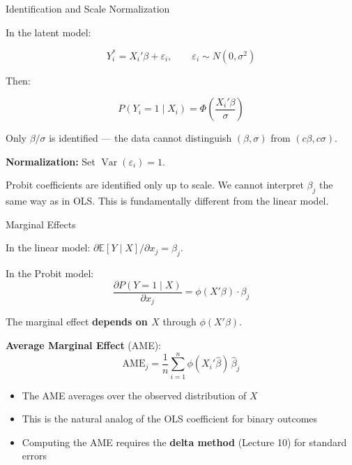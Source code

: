 \documentclass[aspectratio=169, handout, t]{beamer}
\numberwithin{equation}{section}
\begin{document}

\begin{frame}{Identification and Scale Normalization}

In the latent model:

\[
Y_i^* = X_i'\beta + \varepsilon_i, \qquad \varepsilon_i \sim N(0,\sigma^2)
\]

\pause

Then:

\[
P(Y_i=1 \mid X_i)
=
\Phi\left(\frac{X_i'\beta}{\sigma}\right)
\]

\pause

Only $\beta/\sigma$ is identified --- the data cannot distinguish $(\beta, \sigma)$ from $(c\beta, c\sigma)$.

\pause

\textbf{Normalization:} Set $\operatorname{Var}(\varepsilon_i) = 1$.

\pause

\begin{tcolorbox}[colback=blue!5, colframe=blue!50, title=Key Point]
Probit coefficients are identified only up to scale. We cannot interpret $\beta_j$ the same way as in OLS. This is fundamentally different from the linear model.
\end{tcolorbox}

\end{frame}


\begin{frame}{Marginal Effects}

In the linear model: $\partial \mathbb{E}[Y \mid X]/\partial x_j = \beta_j$.

\pause

In the Probit model:
\[
\frac{\partial P(Y=1 \mid X)}{\partial x_j}
=
\phi(X'\beta) \cdot \beta_j
\]

\pause

The marginal effect \textbf{depends on $X$} through $\phi(X'\beta)$.

\pause

\bigskip

\textbf{Average Marginal Effect} (AME):
\[
\widehat{\text{AME}}_j = \frac{1}{n}\sum_{i=1}^n \phi(X_i'\hat\beta)\,\hat\beta_j
\]

\pause

\begin{itemize}
    \item The AME averages over the observed distribution of $X$
    \item This is the natural analog of the OLS coefficient for binary outcomes
    \item Computing the AME requires the \textbf{delta method} (Lecture 10) for standard errors
\end{itemize}

\end{frame}
\end{document}
